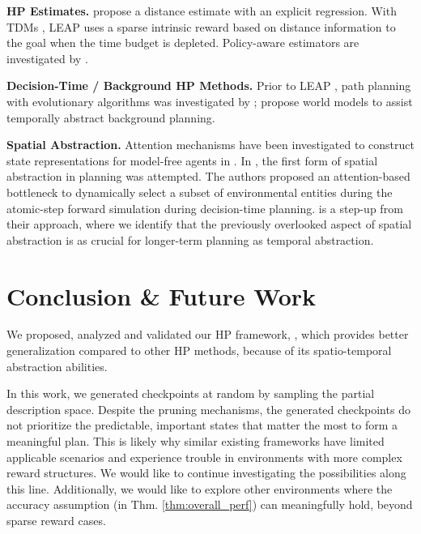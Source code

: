 \textbf{HP Estimates.}
\citet{zhang2021world} propose a distance estimate with an explicit regression. With TDMs \citep{pong2018temporal}, LEAP \citep{nasiriany2019planning} uses a sparse intrinsic reward based on distance information to the goal when the time budget is depleted. Policy-aware estimators are investigated by \citet{nachum2018dataefficient}.

\textbf{Decision-Time / Background HP Methods.}
Prior to LEAP \citep{nasiriany2019planning}, path planning with evolutionary algorithms was investigated by \citet{nair2019hierarchical}; \citet{hafner2022deep,mendonca2021discovering} propose world models to assist temporally abstract background planning.

\textbf{Spatial Abstraction.} Attention mechanisms have been investigated to construct state representations for model-free agents in \citep{mott2019towards,manchin2019reinforcement,tang2020neuroevolution}. In \citet{zhao2021consciousness}, the first form of spatial abstraction in planning was attempted. The authors proposed an attention-based bottleneck to dynamically select a subset of environmental entities during the atomic-step forward simulation during decision-time planning. \agentshort{} is a step-up from their approach, where we identify that the previously overlooked aspect of spatial abstraction is as crucial for longer-term planning as temporal abstraction.

\section{Conclusion \& Future Work}

We proposed, analyzed and validated our HP framework, \agentshort{}, which provides better generalization compared to other HP methods, because of its spatio-temporal abstraction abilities.

In this work, we generated checkpoints at random by sampling the partial description space. Despite the pruning mechanisms, the generated checkpoints do not prioritize the predictable, important states that matter the most to form a meaningful plan. This is likely why similar existing frameworks have limited applicable scenarios and experience trouble in environments with more complex reward structures. We would like to continue investigating the possibilities along this line. Additionally, we would like to explore other environments where the accuracy assumption (in Thm. \ref{thm:overall_perf}) can meaningfully hold, \ie{} beyond sparse reward cases.

